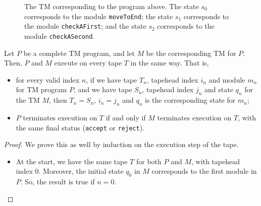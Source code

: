 \begin{appendices}
\begin{figure}[H]
    \caption{The TM corresponding to the program above. The state $s_0$ corresponds to the module \texttt{moveToEnd}; the state $s_1$ corresponds to the module \texttt{checkAFirst}; and the state $s_2$ corresponds to the module \texttt{checkASecond}.}
\end{figure}

\begin{theorem}
    Let $P$ be a complete TM program, and let $M$ be the corresponding TM for $P$. Then, $P$ and $M$ execute on every tape $T$ in the same way. That is,
    \begin{itemize}
        \item for every valid index $n$, if we have tape $T_n$, tapehead index $i_n$ and module $m_n$ for TM program $P$, and we have tape $S_n$, tapehead index $j_n$ and state $q_n$ for the TM $M$, then $T_n = S_n$, $i_n = j_n$ and $q_n$ is the corresponding state for $m_n$;
        \item $P$ terminates execution on $T$ if and only if $M$ terminates execution on $T$, with the same final status (\texttt{accept} or \texttt{reject}).
    \end{itemize}
\end{theorem}
\begin{proof}
    We prove this as well by induction on the execution step of the tape. 
    \begin{itemize}
        \item At the start, we have the same tape $T$ for both $P$ and $M$, with tapehead index $0$. Moreover, the initial state $q_0$ in $M$ corresponds to the first module in $P$. So, the result is true if $n = 0$. 
        

\end{itemize}
\end{proof}
\end{appendices}
